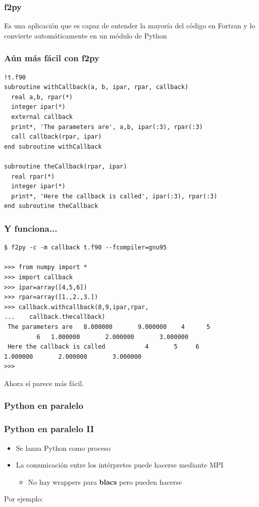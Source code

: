 \documentclass{beamer}
\begin{document}
\begin{frame}
 \frametitle{f2py}
Es una aplicación que es capaz de entender la mayoría del código en Fortran y lo convierte automáticamente en un módulo de Python
\end{frame}


\begin{frame}[containsverbatim]
 \frametitle{Aún más fácil con f2py}
\begin{verbatim}
!t.f90
subroutine withCallback(a, b, ipar, rpar, callback)
  real a,b, rpar(*)
  integer ipar(*)
  external callback
  print*, 'The parameters are', a,b, ipar(:3), rpar(:3)
  call callback(rpar, ipar)
end subroutine withCallback

subroutine theCallback(rpar, ipar)
  real rpar(*)
  integer ipar(*)
  print*, 'Here the callback is called', ipar(:3), rpar(:3)
end subroutine theCallback
\end{verbatim}
\end{frame}

\begin{frame}[containsverbatim]
 \frametitle{Y funciona...}
\begin{verbatim}
$ f2py -c -m callback t.f90 --fcompiler=gnu95

>>> from numpy import *
>>> import callback
>>> ipar=array([4,5,6])
>>> rpar=array([1.,2.,3.])
>>> callback.withcallback(8,9,ipar,rpar,
...    callback.thecallback)
 The parameters are   8.000000       9.000000    4      5 
         6   1.000000       2.000000       3.000000
 Here the callback is called           4       5     6  
1.000000       2.000000       3.000000
>>>
\end{verbatim}
\end{frame}

\begin{frame}
 \begin{center}
 \begin{huge}
  Ahora sí parece más fácil.
 \end{huge}
\end{center}
\end{frame}

\begin{frame}
 \frametitle{Python en paralelo}
\begin{center}

\end{center}

\end{frame}

\begin{frame}
 \frametitle{Python en paralelo II}
\begin{itemize}
 \item Se lanza Python como proceso
 \item La comunicación entre los intérpretes puede hacerse mediante MPI
 \begin{itemize}
  \item No hay wrappers para \textbf{blacs} pero pueden hacerse
 \end{itemize}
\end{itemize}
Por ejemplo:
\end{frame}
\end{document}
